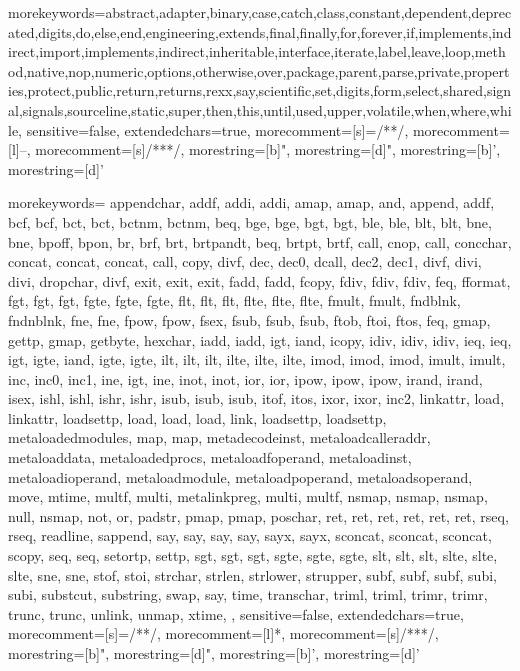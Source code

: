 %
%

\ifdefined\codefont
\else
  \newfontfamily{}
\fi

{morekeywords={abstract,adapter,binary,case,catch,class,constant,dependent,deprecated,digits,do,else,end,engineering,extends,final,finally,for,forever,if,implements,indirect,import,implements,indirect,inheritable,interface,iterate,label,leave,loop,method,native,nop,numeric,options,otherwise,over,package,parent,parse,private,properties,protect,public,return,returns,rexx,say,scientific,set,digits,form,select,shared,signal,signals,sourceline,static,super,then,this,until,used,upper,volatile,when,where,while},
sensitive=false,
extendedchars=true,
morecomment=[s]={/*}{*/},
morecomment=[l]{--},
morecomment=[s]{/**}{*/},
morestring=[b]",
morestring=[d]",
morestring=[b]',
morestring=[d]'}

{morekeywords={
appendchar,
addf,
addi,
addi,
amap,
amap,
and,
append,
addf,
bcf,
bcf,
bct,
bct,
bctnm,
bctnm,
beq,
bge,
bge,
bgt,
bgt,
ble,
ble,
blt,
blt,
bne,
bne,
bpoff,
bpon,
br,
brf,
brt,
brtpandt,
beq,
brtpt,
brtf,
call,
cnop,
call,
concchar,
concat,
concat,
concat,
call,
copy,
divf,
dec,
dec0,
dcall,
dec2,
dec1,
divf,
divi,
divi,
dropchar,
divf,
exit,
exit,
exit,
fadd,
fadd,
fcopy,
fdiv,
fdiv,
fdiv,
feq,
fformat,
fgt,
fgt,
fgt,
fgte,
fgte,
fgte,
flt,
flt,
flt,
flte,
flte,
flte,
fmult,
fmult,
fndblnk,
fndnblnk,
fne,
fne,
fpow,
fpow,
fsex,
fsub,
fsub,
fsub,
ftob,
ftoi,
ftos,
feq,
gmap,
gettp,
gmap,
getbyte,
hexchar,
iadd,
iadd,
igt,
iand,
icopy,
idiv,
idiv,
idiv,
ieq,
ieq,
igt,
igte,
iand,
igte,
igte,
ilt,
ilt,
ilt,
ilte,
ilte,
ilte,
imod,
imod,
imod,
imult,
imult,
inc,
inc0,
inc1,
ine,
igt,
ine,
inot,
inot,
ior,
ior,
ipow,
ipow,
ipow,
irand,
irand,
isex,
ishl,
ishl,
ishr,
ishr,
isub,
isub,
isub,
itof,
itos,
ixor,
ixor,
inc2,
linkattr,
load,
linkattr,
loadsettp,
load,
load,
load,
link,
loadsettp,
loadsettp,
metaloadedmodules,
map,
map,
metadecodeinst,
metaloadcalleraddr,
metaloaddata,
metaloadedprocs,
metaloadfoperand,
metaloadinst,
metaloadioperand,
metaloadmodule,
metaloadpoperand,
metaloadsoperand,
move,
mtime,
multf,
multi,
metalinkpreg,
multi,
multf,
nsmap,
nsmap,
nsmap,
null,
nsmap,
not,
or,
padstr,
pmap,
pmap,
poschar,
ret,
ret,
ret,
ret,
ret,
ret,
rseq,
rseq,
readline,
sappend,
say,
say,
say,
say,
sayx,
sayx,
sconcat,
sconcat,
sconcat,
scopy,
seq,
seq,
setortp,
settp,
sgt,
sgt,
sgt,
sgte,
sgte,
sgte,
slt,
slt,
slt,
slte,
slte,
slte,
sne,
sne,
stof,
stoi,
strchar,
strlen,
strlower,
strupper,
subf,
subf,
subf,
subi,
subi,
substcut,
substring,
swap,
say,
time,
transchar,
triml,
triml,
trimr,
trimr,
trunc,
trunc,
unlink,
unmap,
xtime,
  },
sensitive=false,
extendedchars=true,
morecomment=[s]={/*}{*/},
morecomment=[l]{*},
morecomment=[s]{/**}{*/},
morestring=[b]",
morestring=[d]",
morestring=[b]',
morestring=[d]'}

